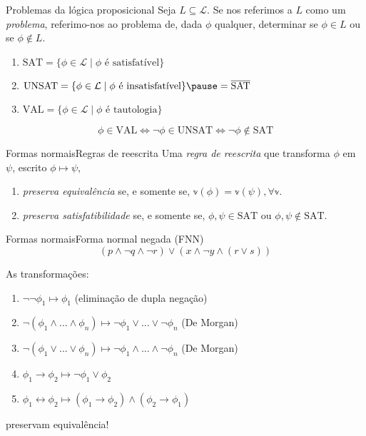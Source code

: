 \begin{frame}{Problemas da lógica proposicional}
	Seja $L \subseteq \mathcal{L}$. Se nos referimos a $L$ como um \emph{problema}, referimo-nos ao problema de, dada $\phi$ qualquer, determinar se $\phi \in L$ ou se $\phi \notin L$.
	\vspace{-.3cm}
	\begin{enumerate}
		\pause\item $\text{SAT} = \{\phi \in \mathcal{L} \mid \phi \text{ é satisfatível} \}$
		\pause\item $\text{UNSAT} = \{\phi \in \mathcal{L} \mid \phi \text{ é insatisfatível} \}\pause = \overline{\text{SAT}}$
		\pause\item $\text{VAL} = \{\phi \in \mathcal{L} \mid \phi \text{ é tautologia} \}$
	\end{enumerate}
	
	\vspace{.2cm}
	\pause $$\phi \in \text{VAL} \iff \neg \phi \in \text{UNSAT} \iff \neg \phi \notin \text{SAT}$$
\end{frame}

\begin{frame}{Formas normais}{Regras de reescrita}
	Uma \emph{regra de reescrita} que transforma $\phi$ em $\psi$, escrito $\phi \longmapsto \psi$,
	\begin{enumerate}
		\pause\item \emph{preserva equivalência} se, e somente se, $\mathbb{v}(\phi) = \mathbb{v}(\psi), \forall \mathbb{v}$.
		\pause\item \emph{preserva satisfatibilidade} se, e somente se, $\phi,\psi \in \text{SAT}$ ou $\phi,\psi \notin \text{SAT}$.
	\end{enumerate}
\end{frame}

\begin{frame}{Formas normais}{Forma normal negada (FNN)}
	$$(p \wedge \neg q \wedge \neg r) \vee (x \wedge \neg y \wedge (r \vee s))$$
	
	\pause As transformações:
	\begin{enumerate}
		\item $\neg \neg \phi_1 \longmapsto \phi_1$ \;\; (eliminação de dupla negação)
		\item $\neg(\phi_1 \wedge ... \wedge \phi_n) \longmapsto \neg \phi_1 \vee ... \vee \neg \phi_n$ \;\; (De Morgan)
		\item $\neg(\phi_1 \vee ... \vee \phi_n) \longmapsto \neg \phi_1 \wedge ... \wedge \neg \phi_n$ \;\; (De Morgan)
		\item $\phi_1 \rightarrow \phi_2 \longmapsto \neg \phi_1 \vee \phi_2$
		\item $\phi_1 \leftrightarrow \phi_2 \longmapsto (\phi_1 \rightarrow \phi_2) \wedge (\phi_2 \rightarrow \phi_1)$
	\end{enumerate}
	\pause preservam equivalência!
\end{frame}

